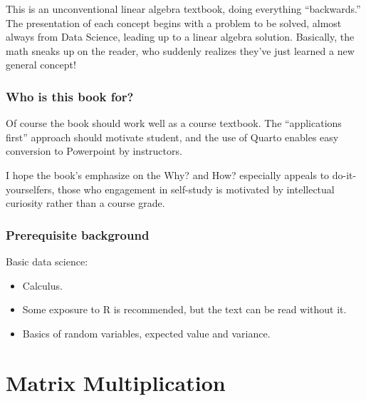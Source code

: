 \documentclass[
  letterpaper,
  DIV=11,
  numbers=noendperiod,
  oneside]{scrreprt}
\begin{document}
This is an unconventional linear algebra textbook, doing everything
``backwards.'' The presentation of each concept begins with a problem to
be solved, almost always from Data Science, leading up to a linear
algebra solution. Basically, the math sneaks up on the reader, who
suddenly realizes they've just learned a new general concept!

\hypertarget{who-is-this-book-for}{%
\subsection*{Who is this book for?}\label{who-is-this-book-for}}

Of course the book should work well as a course textbook. The
``applications first'' approach should motivate student, and the use of
Quarto enables easy conversion to Powerpoint by instructors.

I hope the book's emphasize on the Why? and How? especially appeals to
do-it-yourselfers, those who engagement in self-study is motivated by
intellectual curiosity rather than a course grade.

\hypertarget{prerequisite-background}{%
\subsection*{Prerequisite background}\label{prerequisite-background}}

Basic data science:

\begin{itemize}
\item
  Calculus.
\item
  Some exposure to R is recommended, but the text can be read without
  it.{}
\item
  Basics of random variables, expected value and variance.
\end{itemize}


\hypertarget{matrix-multiplication}{%
\chapter{Matrix Multiplication}\label{matrix-multiplication}}
\end{document}
